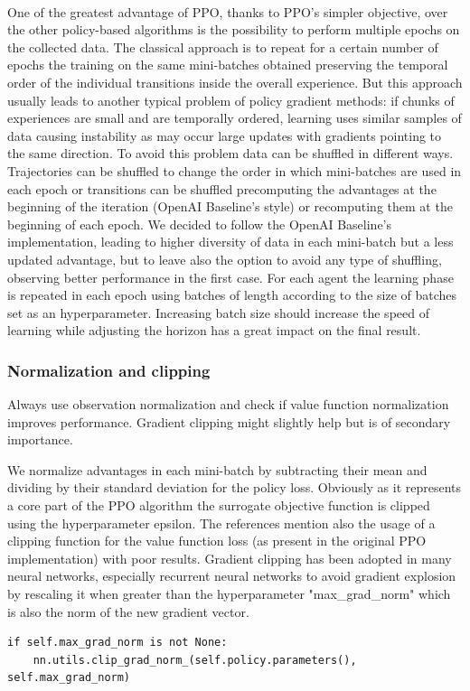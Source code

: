 \documentclass[11pt, a4paper, hidelinks]{report}
\begin{document}
\\
One of the greatest advantage of PPO, thanks to PPO's simpler objective, over the other policy-based algorithms is the possibility to perform multiple epochs on the collected data.
The classical approach is to repeat for a certain number of epochs the training on the same mini-batches obtained preserving the temporal order of the individual transitions inside the overall experience.
But this approach usually leads to another typical problem of policy gradient methods: if chunks of experiences are small and are temporally ordered, learning uses similar samples of data causing instability as may occur large updates with gradients pointing to the same direction.
To avoid this problem data can be shuffled in different ways.
Trajectories can be shuffled to change the order in which mini-batches are used in each epoch or transitions can be shuffled precomputing the advantages at the beginning of the iteration (OpenAI Baseline's style) or recomputing them at the beginning of each epoch.
We decided to follow the OpenAI Baseline's implementation, leading to higher diversity of data in each mini-batch but a less updated advantage, but to leave also the option to avoid any type of shuffling, observing better performance in the first case.
For each agent the learning phase is repeated in each epoch using batches of length according to the size of batches set as an hyperparameter.
Increasing batch size should increase the speed of learning while adjusting the horizon has a great impact on the final result.

\subsubsection{Normalization and clipping}

\begin{quoting}[font=itshape, begintext={"}, endtext={"\citep{ppo-implementation-2}}]
Always use observation normalization and check if value function normalization improves performance.
Gradient clipping might slightly help but is of secondary importance.
\end{quoting}

We normalize advantages in each mini-batch by subtracting their mean and dividing by their standard deviation for the policy loss.
Obviously as it represents a core part of the PPO algorithm the surrogate objective function is clipped using the hyperparameter epsilon.
The references mention also the usage of a clipping function for the value function loss (as present in the original PPO implementation) with poor results.
Gradient clipping has been adopted in many neural networks, especially recurrent neural networks to avoid gradient explosion by rescaling it when greater than the hyperparameter "max\_grad\_norm" which is also the norm of the new gradient vector.
\begin{lstlisting}[label={lst:gradient-clipping}]
if self.max_grad_norm is not None:
	nn.utils.clip_grad_norm_(self.policy.parameters(), self.max_grad_norm)
\end{lstlisting}
\end{document}
